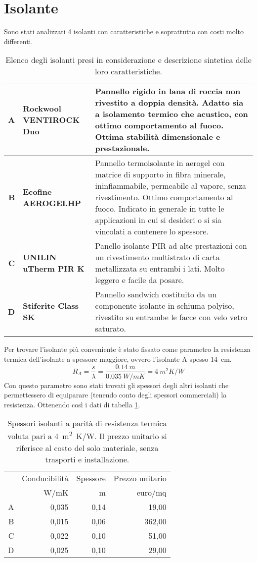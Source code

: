 \section{Isolante}
Sono stati analizzati 4 isolanti con caratteristiche e soprattutto con costi molto differenti.
\begin{table}[H]
\caption{Elenco degli isolanti presi in considerazione e descrizione sintetica delle loro caratteristiche.}
\centering
\begin{tabularx}{\textwidth}{rXX}
    \toprule
        \textbf{A} & \textbf{Rockwool VENTIROCK Duo} & Pannello rigido in lana di roccia non rivestito a doppia densità. 
        Adatto sia a isolamento termico che acustico, con ottimo comportamento al fuoco. 
        Ottima stabilità dimensionale e prestazionale. \\\midrule
        \textbf{B} & \textbf{Ecofine AEROGELHP} & Pannello termoisolante in aerogel con matrice di supporto in fibra minerale, ininfiammabile, permeabile al vapore, senza rivestimento. 
        Ottimo comportamento al fuoco. 
        Indicato in generale in tutte le applicazioni in cui si desideri o si sia vincolati a contenere lo spessore.\\\midrule
        \textbf{C} & \textbf{UNILIN uTherm PIR K} & Panello isolante PIR ad alte prestazioni con un rivestimento multistrato di carta metallizzata su entrambi i lati. 
        Molto leggero e facile da posare.\\\midrule
        \textbf{D} & \textbf{Stiferite Class SK} & Pannello sandwich costituito da un componente isolante in schiuma polyiso, rivestito su entrambe le facce con velo vetro saturato.\\
    \bottomrule
\end{tabularx}
\end{table}
Per trovare l'isolante più conveniente è stato fissato come parametro la resistenza termica dell'isolante a spessore maggiore, ovvero l'isolante A spesso \SI{14}{\centi\metre}.
\[R_A = \frac{s}{\lambda}=\frac{\SI{0.14}{m}}{\SI{0.035}{W/mK}}=\SI{4}{m^2K\per W}\]
Con questo parametro sono stati trovati gli spessori degli altri isolanti che permettessero di equiparare (tenendo conto degli spessori commerciali) la resistenza. 
Ottenendo così i dati di tabella \ref{tab:Isolanti}.
\begin{table}[htb]
\centering
\caption{Spessori isolanti a parità di resistenza termica voluta pari a \SI{4}{m^2K/W}. Il prezzo unitario si riferisce al costo del solo materiale, senza trasporti e installazione.}
\label{tab:Isolanti}
\begin{tabular}{@{}rrrr@{}}
\toprule
  & Conducibilità & Spessore & Prezzo unitario \\ 
  & W/mK          & m        & euro/mq            \\ \midrule
A & 0,035         & 0,14     & 19,00           \\
B & 0,015         & 0,06     & 362,00          \\
C & 0,022         & 0,10     & 51,00           \\
D & 0,025         & 0,10     & 29,00           \\ \bottomrule
\end{tabular}%
\end{table}

